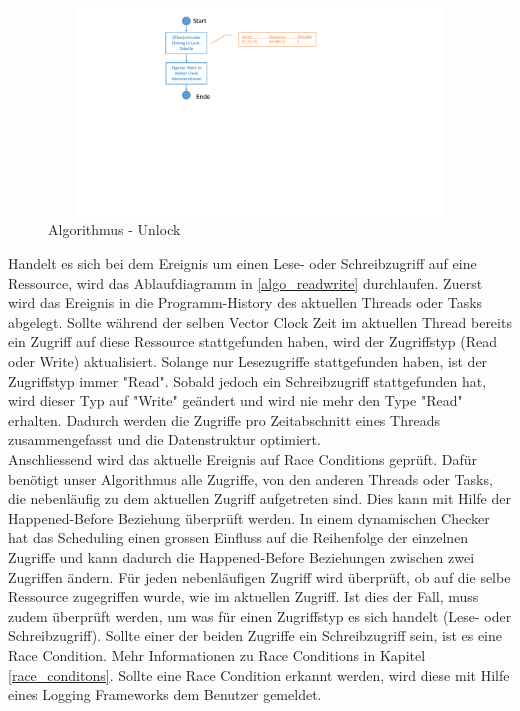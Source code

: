 \documentclass[10pt,a4paper]{article}
\begin{document}
\begin{flushleft}
\begin{figure}[H]
\centering
	\includegraphics[width=12cm,height=5.5cm,trim=70mm 106mm 100mm 8mm, clip]{images/Unlock.pdf}
\caption{Algorithmus - Unlock}\label{algo_unlock}
\end{figure}
Handelt es sich bei dem Ereignis um einen Lese- oder Schreibzugriff auf eine Ressource, wird das Ablaufdiagramm in \autoref{algo_readwrite} durchlaufen. Zuerst wird das Ereignis in die Programm-History des aktuellen Threads oder Tasks abgelegt. Sollte während der selben Vector Clock Zeit im aktuellen Thread bereits ein Zugriff auf diese Ressource stattgefunden haben, wird der Zugriffstyp (Read oder Write) aktualisiert. Solange nur Lesezugriffe stattgefunden haben, ist der Zugriffstyp immer "Read". Sobald jedoch ein Schreibzugriff stattgefunden hat, wird dieser Typ auf "Write" geändert und wird nie mehr den Type "Read" erhalten. Dadurch werden die Zugriffe pro Zeitabschnitt eines Threads zusammengefasst und die Datenstruktur optimiert.\\
Anschliessend wird das aktuelle Ereignis auf Race Conditions geprüft. Dafür benötigt unser Algorithmus alle Zugriffe, von den anderen Threads oder Tasks, die nebenläufig zu dem aktuellen Zugriff aufgetreten sind. Dies kann mit Hilfe der Happened-Before Beziehung überprüft werden. In einem dynamischen Checker hat das Scheduling einen grossen Einfluss auf die Reihenfolge der einzelnen Zugriffe und kann dadurch die Happened-Before Beziehungen zwischen zwei Zugriffen ändern. Für jeden nebenläufigen Zugriff wird überprüft, ob auf die selbe Ressource zugegriffen wurde, wie im aktuellen Zugriff. Ist dies der Fall, muss zudem überprüft werden, um was für einen Zugriffstyp es sich handelt (Lese- oder Schreibzugriff). Sollte einer der beiden Zugriffe ein Schreibzugriff sein, ist es eine Race Condition. Mehr Informationen zu Race Conditions in Kapitel \ref{race_conditons}. Sollte eine Race Condition erkannt werden, wird diese mit Hilfe eines Logging Frameworks dem Benutzer gemeldet.
\begin{figure}[H]

\end{figure}
\end{flushleft}
\end{document}
